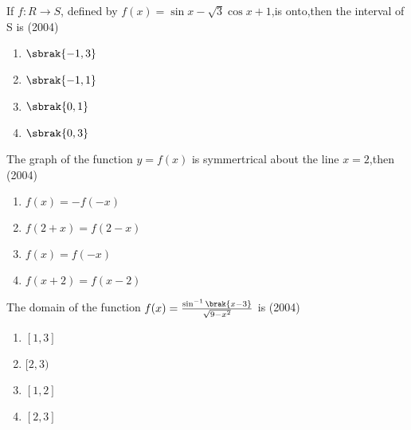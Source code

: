 \item If $f:R\to S$, defined by $f(x)=\sin{x}-\sqrt{3}\cos{x}+1$,is onto,then the interval of S is \hfill(2004)

	       \begin{enumerate}
		       \item $\sbrak{-1,3}$
		       \item $\sbrak{-1,1}$
		       \item $\sbrak{0,1}$
		       \item $\sbrak{0,3}$
	       \end{enumerate}

       \item The graph of the function $y=f(x)$ is symmertrical about the line $x=2$,then \hfill(2004)
	       \begin{enumerate}
		       \item $f(x)=-f(-x)$
		       \item $f(2+x)=f(2-x)$
		       \item $f(x)=f(-x)$
		       \item $f(x+2)=f(x-2)$
	       \end{enumerate}

       \item The domain of the function $f(x)=\frac{\sin^{-1}\brak{x-3}}{\sqrt{9-x^{2}}}$ is \hfill(2004)
              \begin{enumerate}
		      \item $[1,3]$
		      \item $[2,3)$
		      \item $[1,2]$
		      \item $[2,3]$
	      \end{enumerate}

